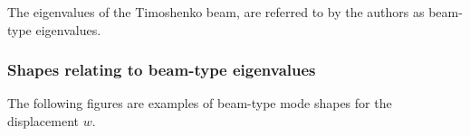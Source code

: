 \documentclass[../../main.tex]{subfiles}
\begin{document}
The eigenvalues of the Timoshenko beam, are referred to by the authors as beam-type eigenvalues.

\subsubsection{Shapes relating to beam-type eigenvalues}
The following figures are examples of beam-type mode shapes for the displacement $w$.

\begin{figure}[h!]
\end{figure}
\end{document}
